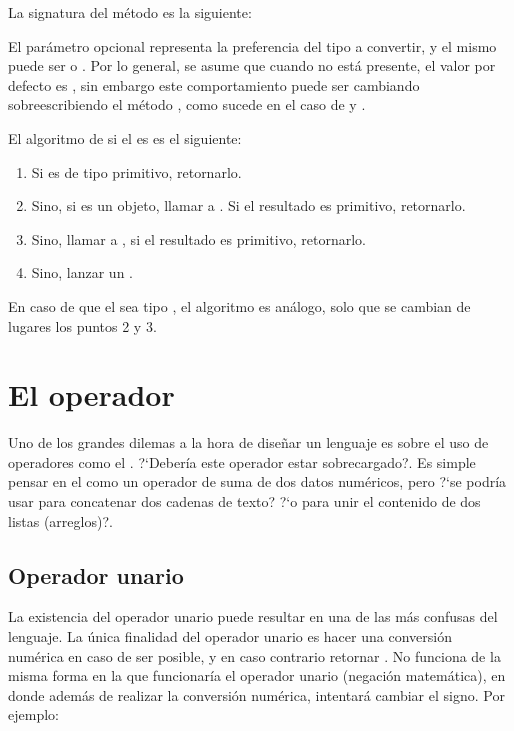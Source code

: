La signatura del método es la siguiente: 

El parámetro opcional  representa la preferencia del tipo a convertir, y el mismo puede ser  o . Por lo general, se asume que cuando no está presente, el valor por defecto es , sin embargo este comportamiento puede ser cambiando sobreescribiendo el método , como sucede en el caso de  y .

El algoritmo de  si el  es  es el siguiente:

\begin{enumerate}
\item Si  es de tipo primitivo, retornarlo.
\item Sino, si  es un objeto, llamar a . Si el resultado es primitivo, retornarlo.
\item Sino, llamar a , si el resultado es primitivo, retornarlo.
\item Sino, lanzar un .
\end{enumerate}

En caso de que el  sea tipo , el algoritmo es análogo, solo que se cambian de lugares los puntos 2 y 3.

\section{El operador \code{+}}
\label{sec:operadormas}

Uno de los grandes dilemas a la hora de diseñar un lenguaje es sobre el uso de operadores como el \code{+}. ?`Debería este operador estar sobrecargado?. Es simple pensar en el \code{+} como un operador de suma de dos datos numéricos, pero ?`se podría usar para concatenar dos cadenas de texto? ?`o para unir el contenido de dos listas (arreglos)?.

\subsection{Operador unario}

La existencia del operador unario \code{+} puede resultar en una de las más confusas del lenguaje. La única finalidad del operador unario \code{+} es hacer una conversión numérica en caso de ser posible, y en caso contrario retornar . No funciona de la misma forma en la que funcionaría el operador unario \code{-} (negación matemática), en donde además de realizar la conversión numérica, intentará cambiar el signo. Por ejemplo:

